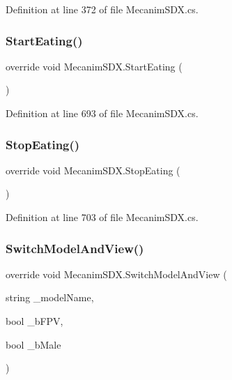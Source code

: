 Definition at line 372 of file Mecanim\+S\+D\+X.\+cs.

\mbox{\label{class_mecanim_s_d_x_a0b9031ac24efb04678b8e11e40ddae5a}} 
\subsubsection{\texorpdfstring{StartEating()}{StartEating()}}
{\footnotesize\ttfamily override void Mecanim\+S\+D\+X.\+Start\+Eating (\begin{DoxyParamCaption}{ }\end{DoxyParamCaption})}



Definition at line 693 of file Mecanim\+S\+D\+X.\+cs.

\mbox{\label{class_mecanim_s_d_x_a6e5fb86facf2bb4622bc9a15e127a2bd}} 
\subsubsection{\texorpdfstring{StopEating()}{StopEating()}}
{\footnotesize\ttfamily override void Mecanim\+S\+D\+X.\+Stop\+Eating (\begin{DoxyParamCaption}{ }\end{DoxyParamCaption})}



Definition at line 703 of file Mecanim\+S\+D\+X.\+cs.

\mbox{\label{class_mecanim_s_d_x_a5a790d1838ab1258de11be176a5298b8}} 
\subsubsection{\texorpdfstring{SwitchModelAndView()}{SwitchModelAndView()}}
{\footnotesize\ttfamily override void Mecanim\+S\+D\+X.\+Switch\+Model\+And\+View (\begin{DoxyParamCaption}\item[{string}]{\+\_\+model\+Name,  }\item[{bool}]{\+\_\+b\+F\+PV,  }\item[{bool}]{\+\_\+b\+Male }\end{DoxyParamCaption})}



